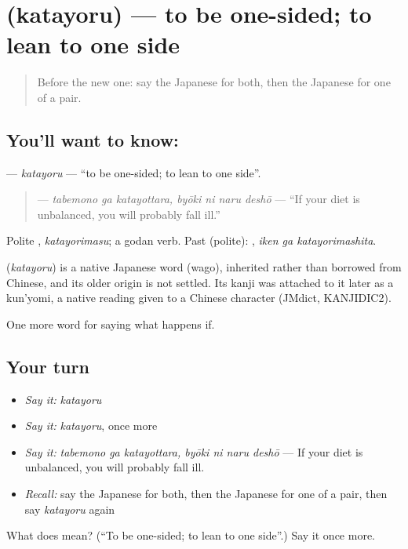 \section[\texorpdfstring{\ja{かたよる} (katayoru)}{かたよる (katayoru)}]{ (katayoru) — to be one-sided; to lean to one side}

\label{lesson:JA-C368-katayoru}



\begin{quote}
Before the new one: say the Japanese for both, then the Japanese for one of a pair.
\end{quote}

\subsection*{You'll want to know: }
\textbf{} — \emph{katayoru} — \textquotedblleft{}to be one-sided; to lean to one side\textquotedblright{}.

\begin{quote}
\textbf{  } — \emph{tabemono ga katayottara, byōki ni naru deshō} — \textquotedblleft{}If your diet is unbalanced, you will probably fall ill.\textquotedblright{}
\end{quote}

Polite \textbf{}, \emph{katayorimasu}; a godan verb. Past (polite): \textbf{ }, \emph{iken ga katayorimashita}.

\begin{cousinweb}
\textbf{} (\emph{katayoru}) is a native Japanese word (wago), inherited rather than borrowed from Chinese, and its older origin is not settled. Its kanji was attached to it later as a kun'yomi, a native reading given to a Chinese character (JMdict, KANJIDIC2).
\end{cousinweb}

\begin{grammarlens}[title={What you've built}]
One more word for saying what happens if.
\end{grammarlens}

\subsection*{Your turn}
\begin{itemize}
\raggedright
  \item \emph{Say it:} \emph{katayoru}
  \item \emph{Say it:} \emph{katayoru}, once more
  \item \emph{Say it:} \emph{tabemono ga katayottara, byōki ni naru deshō} — If your diet is unbalanced, you will probably fall ill.
  \item \emph{Recall:} say the Japanese for both, then the Japanese for one of a pair, then say \emph{katayoru} again
\end{itemize}

\begin{tcolorbox}[breakable,colback=teal!4,colframe=teal!35!black,title={Before you move on}]
What does  mean? (\textquotedblleft{}To be one-sided; to lean to one side\textquotedblright{}.) Say it once more.
\end{tcolorbox}
